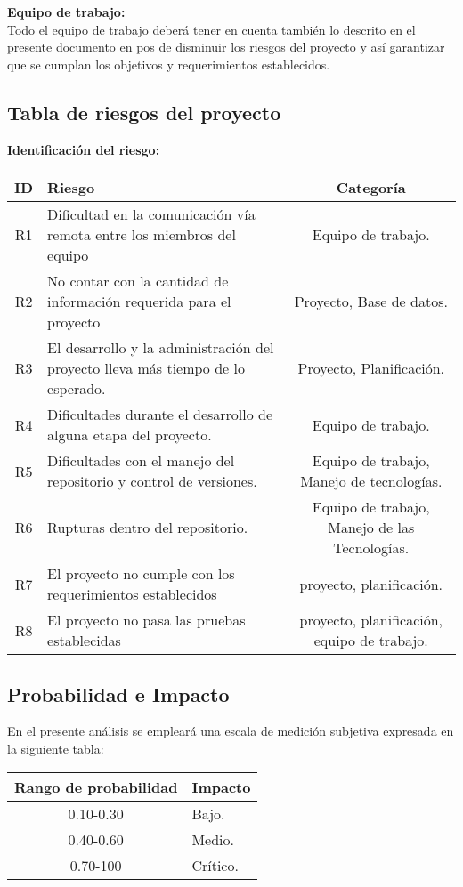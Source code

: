 \documentclass[12pt,a4paper]{article}
\begin{document}
\textbf {Equipo de trabajo:} \vspace{5 mm} \\
Todo el equipo de trabajo deberá tener en cuenta también lo descrito en el presente documento en pos de
disminuir los riesgos del proyecto y así garantizar que se cumplan los objetivos y requerimientos establecidos.
\newpage

\subsection{Tabla de riesgos del proyecto}
\vspace{1 cm}
\textbf{Identificación del riesgo:}
\begin{table}[h!]
\centering
\begin{tabular}{|c|p{8cm}|c|}
\hline
\textbf{ID}&\textbf{Riesgo}&\textbf{Categoría}
\\\hline
R1&Dificultad en la comunicación vía remota entre los miembros del equipo&Equipo de trabajo.\\\hline
R2&No contar con la cantidad de información requerida para el proyecto&Proyecto, Base de datos.\\\hline
R3&El desarrollo y la administración del proyecto lleva más tiempo de lo esperado.&Proyecto, Planificación.\\\hline
R4&Dificultades durante el desarrollo de alguna etapa del proyecto.&Equipo de trabajo.\\\hline
R5&Dificultades con el manejo del repositorio y control de versiones.&Equipo de trabajo, Manejo de tecnologías.\\\hline
R6&Rupturas dentro del repositorio.&Equipo de trabajo, Manejo de las Tecnologías.\\\hline
R7&El proyecto no cumple con los requerimientos establecidos&proyecto, planificación.\\\hline
R8&El proyecto no pasa las pruebas establecidas&proyecto, planificación, equipo de trabajo.\\\hline
\end{tabular}
\end{table}

\subsection{Probabilidad e Impacto}
En el presente análisis se empleará una escala de medición subjetiva expresada
en la siguiente tabla: 
\begin{table}[h!]
\begin{tabular}{|c|p{8cm}|}
\hline
\textbf{Rango de probabilidad}&\textbf{Impacto}
\\\hline
0.10-0.30&Bajo.\\\hline
0.40-0.60&Medio.\\\hline
0.70-100&Crítico.\\\hline
\end{tabular}
\end{table}
\end{document}
